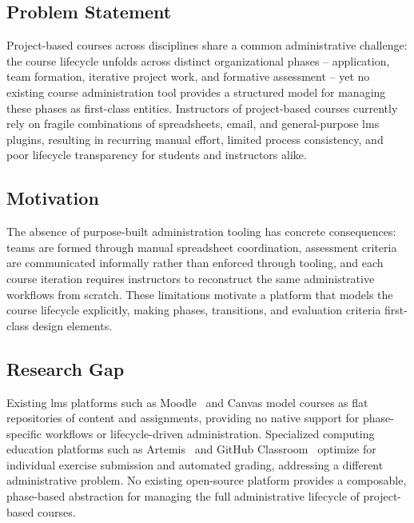 
\label{sec:introduction}

\subsection{Problem Statement}

Project-based courses across disciplines share a common administrative challenge:
the course lifecycle unfolds across distinct organizational phases -- application, team formation, iterative project work, and formative assessment -- yet no existing course administration tool provides a structured model for managing these phases as first-class entities.
Instructors of project-based courses currently rely on fragile combinations of spreadsheets, email, and general-purpose \acrfull{lms} plugins, resulting in recurring manual effort, limited process consistency, and poor lifecycle transparency for students and instructors alike.

\subsection{Motivation}

The absence of purpose-built administration tooling has concrete consequences:
teams are formed through manual spreadsheet coordination, assessment criteria are communicated informally rather than enforced through tooling, and each course iteration requires instructors to reconstruct the same administrative workflows from scratch.
These limitations motivate a platform that models the course lifecycle explicitly, making phases, transitions, and evaluation criteria first-class design elements.

\subsection{Research Gap}

Existing \acrshort{lms} platforms such as Moodle~\cite{moodle} and Canvas model courses as flat repositories of content and assignments, providing no native support for phase-specific workflows or lifecycle-driven administration.
Specialized computing education platforms such as Artemis~\cite{artemis} and GitHub Classroom~\cite{github-classroom} optimize for individual exercise submission and automated grading, addressing a different administrative problem.
No existing open-source platform provides a composable, phase-based abstraction for managing the full administrative lifecycle of project-based courses.

